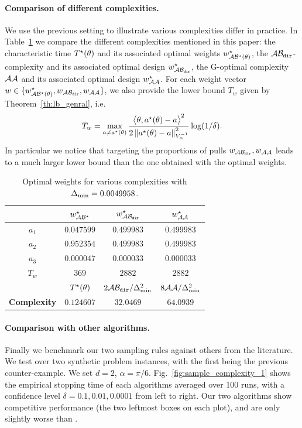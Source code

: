 \paragraph{Comparison of different complexities.}
We use the previous setting to illustrate various complexities differ in practice. In Table~\ref{table:optimal_weights} we compare the different complexities mentioned in this paper: the characteristic time $T^{\star}(\theta)$ and its associated optimal weights $w^\star_{\mathcal{A}\mathcal{B}^\star(\theta)}$, the $\mathcal{A}\mathcal{B}_{\texttt{dir}}$-complexity and its associated optimal design $w^\star_{\mathcal{A}\mathcal{B}_{\texttt{dir}}}$, the G-optimal complexity $\mathcal{A}\mathcal{A}$ and its associated optimal design $w^\star_{\mathcal{A}\mathcal{A}}$. For each weight vector $w \in\{w^\star_{\mathcal{A}\mathcal{B}^\star(\theta)},w_{\mathcal{A}\mathcal{B}_{\texttt{dir}}}, w_{\mathcal{A}\mathcal{A}}\}$,
 we also provide the lower bound $T_w$ given by Theorem~\ref{th:lb_genral}, i.e.
 \[
 T_w = \max_{a\neq a^\star(\theta)} \frac{\big\langle \theta, a^\star(\theta)-a\big\rangle^2}{2\left\lVert a^\star(\theta)-a\right\rVert_{V_w^{-1}}^2} \log(1/\delta).
\]
In particular we notice that targeting the proportions of pulls $w_{\mathcal{A}\mathcal{B}_{\texttt{dir}}}, w_{\mathcal{A}\mathcal{A}}$ leads to a much larger lower bound than the one obtained with the optimal weights.
\begin{table}[t!]
\centering
\begin{tabular}{|c|c|c|c|}
 \hline
   & $w^\star_{\mathcal{A}\mathcal{B}^\star}$ & $w^\star_{\mathcal{A}\mathcal{B}_{\texttt{dir}}}$  & $w^\star_{\mathcal{A}\mathcal{A}}$   \\
 \hline
 \textbf{$a_1$} & $0.047599$ & $0.499983$ & $0.499983$ \\
 \hline
 \textbf{$a_2$} & $0.952354$ & $0.499983$ & $0.499983$ \\
 \hline
 \textbf{$a_3$} & $0.000047$ & $0.000033$ & $0.000033$ \\
 \hline
 \textbf{$T_w$} & $369$ & $2882$ & $2882$ \\
 \hline
   & $T^{\star}(\theta)$ & $2\mathcal{A}\mathcal{B}_{\texttt{dir}}/\Delta_\text{min}^2$ & $8\mathcal{A}\mathcal{A}/\Delta_\text{min}^2$\\
 \hline
  \textbf{Complexity} & $0.124607$ & $32.0469$ & $64.0939$ \\
 \hline
\end{tabular}
\caption{Optimal weights for various complexities with $\Delta_\text{min}= 0.0049958$.}
\label{table:optimal_weights}
\end{table}

\paragraph{Comparison with other algorithms.}
Finally we benchmark our two sampling rules against others from the literature. %
We test over two synthetic problem instances, with the first being the previous counter-example. We set $d=2$, $\alpha=\pi/6$. Fig.~\ref{fig:sample_complexity_1} shows the empirical stopping time of each algorithms averaged over 100 runs, with a confidence level $\delta=0.1, 0.01, 0.0001$ from left to right. Our two algorithms show competitive performance (the two leftmost boxes on each plot), and are only slightly worse than \LGapE.


